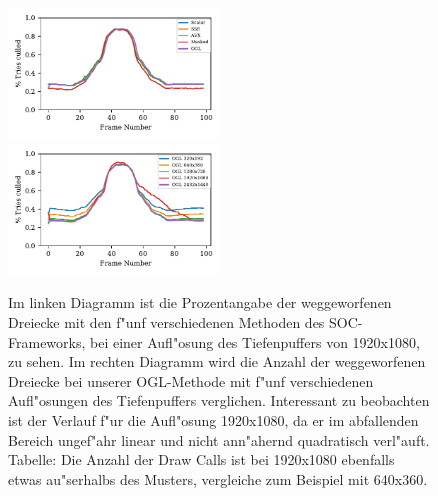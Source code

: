 \documentclass[journal]{vgtc}
\begin{document}
\begin{figure}
	\begin{minipage}{\textwidth}
		\includegraphics[width=0.5\textwidth]{images/Evaluation_1_Results_Percentage culled.pdf}
		\includegraphics[width=0.5\textwidth]{images/Evaluation_4_Results_Percentage culled.pdf}
	\end{minipage}
	\begin{minipage}{\textwidth}
		\centering
	\end{minipage}
	\caption{Im linken Diagramm ist die Prozentangabe der weggeworfenen Dreiecke mit den f"unf verschiedenen Methoden des SOC-Frameworks, bei einer Aufl"osung des Tiefenpuffers von 1920x1080, zu sehen. Im rechten Diagramm wird die Anzahl der weggeworfenen Dreiecke bei unserer OGL-Methode mit f"unf verschiedenen Aufl"osungen des Tiefenpuffers verglichen. Interessant zu beobachten ist der Verlauf f"ur die Aufl"osung 1920x1080, da er im abfallenden Bereich ungef"ahr linear und nicht ann"ahernd quadratisch verl"auft. Tabelle: Die Anzahl der Draw Calls ist bei 1920x1080 ebenfalls etwas au"serhalbs des Musters, vergleiche zum Beispiel mit 640x360.}
	\label{fig:resolution_culled}
\end{figure}
\end{document}
